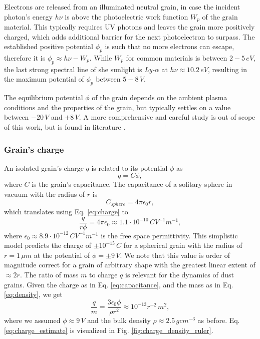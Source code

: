 Electrons are released from an illuminated neutral grain, in case the incident photon's energy $h\nu$ is above the photoelectric work function $W_{p}$ of the grain material. This typically requires UV photons and leaves the grain more positively charged, which adds additional barrier for the next photoelectron to surpass. The established positive potential $\phi_{p}$ is such that no more electrons can escape, therefore it is $\phi_{p} \approx h\nu - W_{p}$. While $W_p$ for common materials is between $2 - 5 \, \si{eV}$, the last strong spectral line of she sunlight is \textit{Ly-$\alpha$} at $h\nu \approx 10.2 \, \si{eV}$, resulting in the maximum potential of $\phi_p$ between $5 - 8 \, \si{V}$. 

The equilibrium potential $\phi$ of the grain depends on the ambient plasma conditions and the properties of the grain, but typically settles on a value between $-20 \, \si{V}$ and $+8 \, \si{V}$. A more comprehensive and careful study is out of scope of this work, but is found in literature \citep{meyer1982flip,horanyi1996charged,krivov1998dynamics,dzhanoev2016charging,vaverka2016lunar}.

\subsubsection{Grain's charge}

An isolated grain's charge $q$ is related to its potential $\phi$ as
\begin{equation}
    q = C \phi, \label{eq:charge}
\end{equation}
where $C$ is the grain's capacitance. The capacitance of a solitary sphere in vacuum with the radius of $r$ is 
\begin{equation}
    C_{sphere} = 4 \pi \epsilon_0 r,
\end{equation}
which translates using Eq. \ref{eq:charge} to
\begin{equation}
    \frac{q}{r \phi} = 4 \pi \epsilon_0 \approx 1.1 \cdot 10^{-10} \, \si{C V^{-1} m^{-1}},
    \label{eq:capacitance}
\end{equation}
where $\epsilon_0 \approx 8.9\cdot10^{-12} \, \si{C V^{-1} m^{-1}}$ is the free space permittivity. This simplistic model predicts the charge of $\pm 10^{-15} \, \si{C}$ for a spherical grain with the radius of $r = 1 \, \si{\mu m}$ at the potential of $\phi = \pm 9 \, \si{V}$. We note that this value is order of magnitude correct for a grain of arbitrary shape with the greatest linear extent of $\approx 2r$. 
The ratio of mass $m$ to charge $q$ is relevant for the dynamics of dust grains. Given the charge as in Eq. \ref{eq:capacitance}, and the mass as in Eq. \ref{eq:density}, we get
\begin{equation}
    \frac{q}{m} = \frac{3 \epsilon_0 \phi}{\rho r^2} \approx 10^{-13} r^{-2} \, \si{m^2},
    \label{eq:charge_estimate}
\end{equation}
where we assumed $\phi \approx 9 \, \si{V}$ and the bulk density $\rho \approx 2.5 \, \si{g cm^{-3}}$ as before. Eq. \ref{eq:charge_estimate} is visualized in Fig. \ref{fig:charge_density_ruler}.

